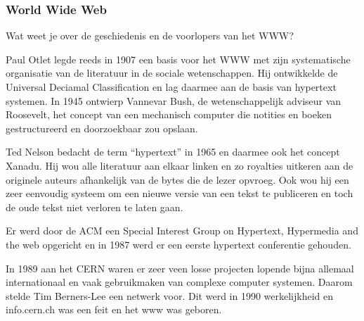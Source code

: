 \documentclass[../main.tex]{subfiles}
\begin{document}
\subsubsection{World Wide Web}
\begin{question}
Wat weet je over de geschiedenis en de voorlopers van het WWW?
\end{question}
\begin{solution}
		Paul Otlet legde reeds in 1907 een basis voor het WWW met zijn systematische organisatie van de literatuur in de sociale wetenschappen.
		Hij ontwikkelde de Universal Deciamal Classification en lag daarmee aan de basis van hypertext systemen.
	In 1945 ontwierp Vannevar Bush, de wetenschappelijk adviseur van Roosevelt, het concept van een mechanisch  computer die notities en boeken gestructureerd en doorzoekbaar zou opslaan.

	Ted Nelson bedacht de term ``hypertext'' in 1965 en daarmee ook het concept Xanadu.
	Hij wou alle literatuur aan elkaar linken en zo royalties uitkeren aan de originele auteurs afhankelijk van de bytes die de lezer opvroeg.
	Ook wou hij een zeer eenvoudig systeem om een nieuwe versie van een tekst te publiceren en toch de oude tekst niet verloren te laten gaan.

	Er werd door de ACM een Special Interest Group on Hypertext, Hypermedia and the web opgericht en in 1987  werd er een eerste hypertext conferentie gehouden.

	In 1989 aan het CERN waren er zeer veen losse projecten lopende bijna allemaal internationaal en vaak gebruikmaken van complexe computer systemen.
	Daarom stelde Tim Berners-Lee een netwerk voor.
	Dit werd in 1990 werkelijkheid en info.cern.ch was een feit en het www was geboren.
\end{solution}
\end{document}
